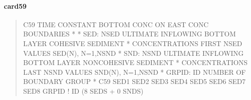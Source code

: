 \documentclass[letterpaper,10pt,english]{sphinxmanual}
\begin{document}
\paragraph{card59}
\label{\detokenize{inputfiles/runcontrol/card59:card59}}\label{\detokenize{inputfiles/runcontrol/card59::doc}}\begin{quote}

\begin{sphinxVerbatim}[commandchars=\\\{\}]
\PYGZhy{}\PYGZhy{}\PYGZhy{}\PYGZhy{}\PYGZhy{}\PYGZhy{}\PYGZhy{}\PYGZhy{}\PYGZhy{}\PYGZhy{}\PYGZhy{}\PYGZhy{}\PYGZhy{}\PYGZhy{}\PYGZhy{}\PYGZhy{}\PYGZhy{}\PYGZhy{}\PYGZhy{}\PYGZhy{}\PYGZhy{}\PYGZhy{}\PYGZhy{}\PYGZhy{}\PYGZhy{}\PYGZhy{}\PYGZhy{}\PYGZhy{}\PYGZhy{}\PYGZhy{}\PYGZhy{}\PYGZhy{}\PYGZhy{}\PYGZhy{}\PYGZhy{}\PYGZhy{}\PYGZhy{}\PYGZhy{}\PYGZhy{}\PYGZhy{}\PYGZhy{}\PYGZhy{}\PYGZhy{}\PYGZhy{}\PYGZhy{}\PYGZhy{}\PYGZhy{}\PYGZhy{}\PYGZhy{}\PYGZhy{}\PYGZhy{}\PYGZhy{}\PYGZhy{}\PYGZhy{}\PYGZhy{}\PYGZhy{}\PYGZhy{}\PYGZhy{}\PYGZhy{}\PYGZhy{}\PYGZhy{}\PYGZhy{}\PYGZhy{}\PYGZhy{}\PYGZhy{}\PYGZhy{}\PYGZhy{}\PYGZhy{}\PYGZhy{}\PYGZhy{}\PYGZhy{}\PYGZhy{}\PYGZhy{}\PYGZhy{}\PYGZhy{}\PYGZhy{}\PYGZhy{}\PYGZhy{}
C59 TIME CONSTANT BOTTOM CONC ON EAST CONC BOUNDARIES
*
*    SED: NSED ULTIMATE INFLOWING BOTTOM LAYER COHESIVE SEDIMENT
*         CONCENTRATIONS  FIRST NSED VALUES SED(N), N=1,NSND
*    SND: NSND ULTIMATE INFLOWING BOTTOM LAYER NON\PYGZhy{}COHESIVE SEDIMENT
*         CONCENTRATIONS LAST NSND VALUES SND(N), N=1,NSND
*  GRPID: ID NUMBER OF BOUNDARY GROUP
*
C59      SED1      SED2      SED3      SED4      SED5      SED6      SED7      SED8      GRPID ! ID (8 SEDS + 0 SNDS)
\end{sphinxVerbatim}
\end{quote}
\end{document}
